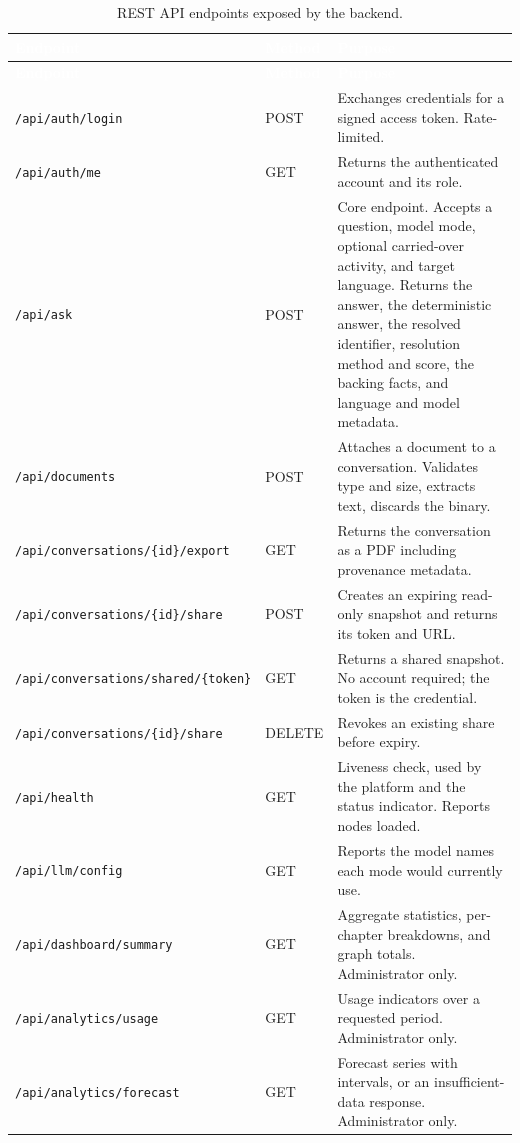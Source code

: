 \begin{longtable}{|p{}|p{}|p{}|}
\caption{REST API endpoints exposed by the backend.}\label{tab:api}\\
\hline
\rowcolor{thesisgreen}\textcolor{white}{\textbf{Endpoint}} & \textcolor{white}{\textbf{Method}} & \textcolor{white}{\textbf{Purpose}} \\
\hline
\endfirsthead
\hline
\rowcolor{thesisgreen}\textcolor{white}{\textbf{Endpoint}} & \textcolor{white}{\textbf{Method}} & \textcolor{white}{\textbf{Purpose}} \\
\hline
\endhead
\texttt{/api/auth/login} & POST & Exchanges credentials for a signed access token. Rate-limited. \\ \hline
\texttt{/api/auth/me} & GET & Returns the authenticated account and its role. \\ \hline
\texttt{/api/ask} & POST & Core endpoint. Accepts a question, model mode, optional carried-over activity, and target language. Returns the answer, the deterministic answer, the resolved identifier, resolution method and score, the backing facts, and language and model metadata. \\ \hline
\texttt{/api/documents} & POST & Attaches a document to a conversation. Validates type and size, extracts text, discards the binary. \\ \hline
\texttt{/api/conversations/\{id\}/export} & GET & Returns the conversation as a PDF including provenance metadata. \\ \hline
\texttt{/api/conversations/\{id\}/share} & POST & Creates an expiring read-only snapshot and returns its token and URL. \\ \hline
\texttt{/api/conversations/shared/\{token\}} & GET & Returns a shared snapshot. No account required; the token is the credential. \\ \hline
\texttt{/api/conversations/\{id\}/share} & DELETE & Revokes an existing share before expiry. \\ \hline
\texttt{/api/health} & GET & Liveness check, used by the platform and the status indicator. Reports nodes loaded. \\ \hline
\texttt{/api/llm/config} & GET & Reports the model names each mode would currently use. \\ \hline
\texttt{/api/dashboard/summary} & GET & Aggregate statistics, per-chapter breakdowns, and graph totals. Administrator only. \\ \hline
\texttt{/api/analytics/usage} & GET & Usage indicators over a requested period. Administrator only. \\ \hline
\texttt{/api/analytics/forecast} & GET & Forecast series with intervals, or an insufficient-data response. Administrator only. \\ \hline
\end{longtable}

